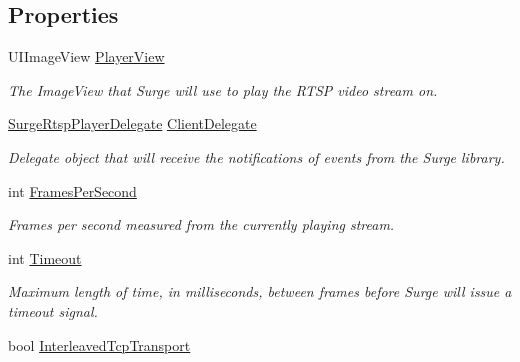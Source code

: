 \subsection*{Properties}
\begin{DoxyCompactItemize}
\item 
U\+I\+Image\+View \hyperlink{interface_surge_xamarini_o_s_bindings_1_1_surge_rtsp_player_ab629f9303d6b427a8213e1dee03a3810}{Player\+View}
\begin{DoxyCompactList}\small\item\em The Image\+View that Surge will use to play the R\+T\+SP video stream on. \end{DoxyCompactList}\item 
\hyperlink{interface_surge_xamarini_o_s_bindings_1_1_surge_rtsp_player_delegate}{Surge\+Rtsp\+Player\+Delegate} \hyperlink{interface_surge_xamarini_o_s_bindings_1_1_surge_rtsp_player_a6c7ed65f9656542894f0ccfe7e728b0e}{Client\+Delegate}
\begin{DoxyCompactList}\small\item\em Delegate object that will receive the notifications of events from the Surge library. \end{DoxyCompactList}\item 
int \hyperlink{interface_surge_xamarini_o_s_bindings_1_1_surge_rtsp_player_a84dbe2b6b5456cbe5e261057e027eb40}{Frames\+Per\+Second}
\begin{DoxyCompactList}\small\item\em Frames per second measured from the currently playing stream. \end{DoxyCompactList}\item 
int \hyperlink{interface_surge_xamarini_o_s_bindings_1_1_surge_rtsp_player_a5d41ebac63bbd4c26859615abcf1fa0e}{Timeout}
\begin{DoxyCompactList}\small\item\em Maximum length of time, in milliseconds, between frames before Surge will issue a timeout signal. \end{DoxyCompactList}\item 
bool \hyperlink{interface_surge_xamarini_o_s_bindings_1_1_surge_rtsp_player_a3c3b5c3ea3dd97de86d36c7fafe333aa}{Interleaved\+Tcp\+Transport}

\end{DoxyCompactItemize}
